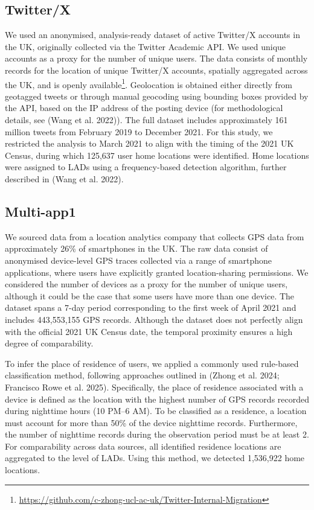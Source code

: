 \documentclass{article}
\begin{document}
\subsection{Twitter/X}\label{twitterx}

We used an anonymised, analysis-ready dataset of active Twitter/X
accounts in the UK, originally collected via the Twitter Academic API.
We used unique accounts as a proxy for the number of unique users. The
data consists of monthly records for the location of unique Twitter/X
accounts, spatially aggregated across the UK, and is openly available\footnote{\url{https://github.com/c-zhong-ucl-ac-uk/Twitter-Internal-Migration}}.
Geolocation is obtained either directly from geotagged tweets or through
manual geocoding using bounding boxes provided by the API, based on the
IP address of the posting device (for methodological details, see
(Wang et al. 2022)). The full dataset includes approximately 161 million tweets
from February 2019 to December 2021. For this study, we restricted the
analysis to March 2021 to align with the timing of the 2021 UK Census,
during which 125,637 user home locations were identified. Home locations
were assigned to LADs using a frequency-based detection algorithm,
further described in (Wang et al. 2022).

\subsection{Multi-app1}\label{multi-app1}

We sourced data from a location analytics company that collects GPS data
from approximately 26\% of smartphones in the UK. The raw data consist of
anonymised device-level GPS traces collected via a range of smartphone
applications, where users have explicitly granted location-sharing
permissions. We considered the number of devices as a proxy for the
number of unique users, although it could be the case that some users
have more than one device. The dataset spans a 7-day period
corresponding to the first week of April 2021 and includes 443,553,155
GPS records. Although the dataset does not perfectly align with the
official 2021 UK Census date, the temporal proximity ensures a high
degree of comparability.

To infer the place of residence of users, we applied a commonly used
rule-based classification method, following approaches outlined in
(Zhong et al. 2024; Francisco Rowe et al. 2025). Specifically, the place of
residence associated with a device is defined as the location with the
highest number of GPS records recorded during nighttime hours (10 PM--6
AM). To be classified as a residence, a location must account for more
than 50\% of the device nighttime records. Furthermore, the number of
nighttime records during the observation period must be at least 2. For
comparability across data sources, all identified residence locations
are aggregated to the level of LADs. Using this method, we detected
1,536,922 home locations.
\end{document}
